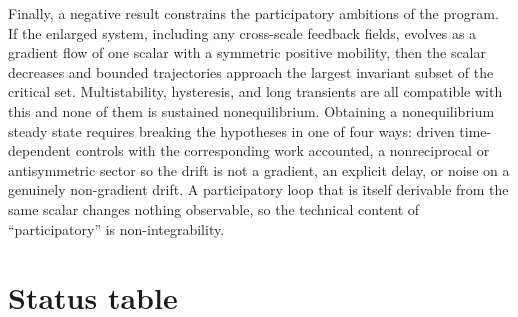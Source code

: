 \documentclass[11pt,letterpaper]{article}
\begin{document}
Finally, a negative result constrains the participatory ambitions of the program. If
the enlarged system, including any cross-scale feedback fields, evolves as a gradient
flow of one scalar with a symmetric positive mobility, then the scalar decreases and
bounded trajectories approach the largest invariant subset of the critical set.
Multistability, hysteresis, and long
transients are all compatible with this and none of them is sustained nonequilibrium.
Obtaining a nonequilibrium steady state requires breaking the hypotheses in one of four
ways: driven time-dependent controls with the corresponding work accounted, a
nonreciprocal or antisymmetric sector so the drift is not a gradient, an explicit delay,
or noise on a genuinely non-gradient drift. A participatory loop that is itself
derivable from the same scalar changes nothing observable, so the technical content of
``participatory'' is non-integrability.

\section{Status table}
\end{document}
